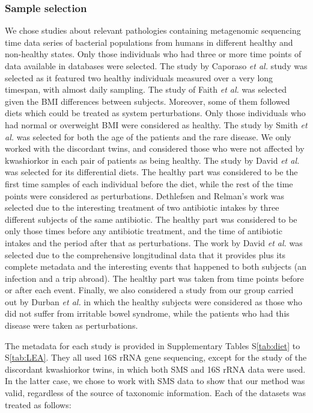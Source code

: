 \subsubsection*{Sample selection}
We chose studies about relevant pathologies containing metagenomic sequencing time data series of bacterial populations from humans in different healthy and non-healthy states. Only those individuals who had three or more time points of data available in databases were selected. The study by Caporaso \textit{et al.} study \cite{moving} was selected as it featured two healthy individuals measured over a very long timespan, with almost daily sampling. The study of Faith \textit{et al.} \cite{LEA} was selected given the BMI differences between subjects. Moreover, some of them followed diets which could be treated as system perturbations. Only those individuals who had normal or overweight BMI were considered as healthy. The study by Smith \textit{et al.} \cite{kwashiorkor} was selected for both the age of the patients and the rare disease. We only worked with the discordant twins, and considered those who were not affected by kwashiorkor in each pair of patients as being healthy. The study by David \textit{et al.} \cite{diet} was selected for its differential diets. The healthy part was considered to be the first time samples of each individual before the diet, while the rest of the time points were considered as perturbations. Dethlefsen and Relman's work \cite{antibiotic} was selected due to the interesting treatment of two antibiotic intakes by three different subjects of the same antibiotic. The healthy part was considered to be only those times before any antibiotic treatment, and the time of antibiotic intakes and the period after that as perturbations. The work by David \textit{et al.} \cite{hostlife} was selected due to the comprehensive longitudinal data that it provides plus its complete metadata and the interesting events that happened to both subjects (an infection and a trip abroad). The healthy part was taken from time points before or after each event. Finally, we also considered a study from our group carried out by Durban \textit{et al.} \cite{IBS} in which the healthy subjects were considered as those who did not suffer from irritable bowel syndrome, while the patients who had this disease were taken as perturbations. 

The metadata for each study is provided in Supplementary Tables S\ref{tab:diet} to S\ref{tab:LEA}. They all used 16S rRNA gene sequencing, except for the study of the discordant kwashiorkor twins\cite{kwashiorkor}, in which both SMS and 16S rRNA data were used. In the latter case, we chose to work with SMS data to show that our method was valid, regardless of the source of taxonomic information. Each of the datasets was treated as follows:

